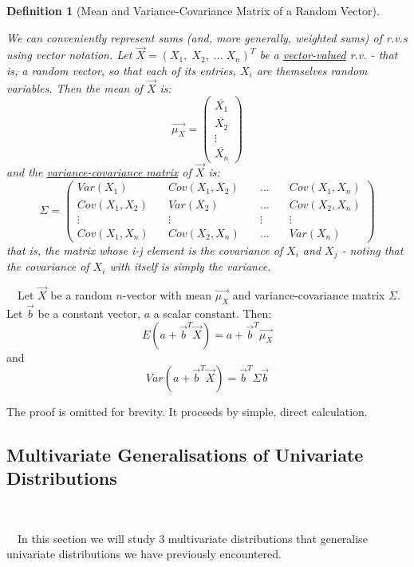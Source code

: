 \documentclass[12pt,a4paper]{article}
\newtheorem{defn}[thm]{Definition}
\begin{document}
\begin{defn}[Mean and Variance-Covariance Matrix of a Random Vector]$\;$\par\vspace{1cm}

We can conveniently represent sums (and, more generally, weighted sums) of r.v.s using vector notation.
Let $\vec{X} = (X_1,\; X_2,\; ...\; X_n)^T$ be a \underline{vector-valued} r.v. - that is, a random vector, so that each of its entries, $X_i$ are themselves random variables. Then the mean of $\vec{X}$ is:
$$\vec{\mu_X} = \left(\begin{array}{c}\overline{X_1}\\ \overline{X_2}\\ \vdots\\ \overline{X_n} \end{array}\right)$$
and the \underline{variance-covariance matrix} of $\vec{X}$ is:
$$\Sigma = \left( \begin{array}{cccc} Var(X_1)\quad& Cov(X_1,X_2)\quad& \hdots\quad& Cov(X_1,X_n)\\Cov(X_1,X_2)\quad& Var(X_2)\quad& \hdots\quad& Cov(X_2,X_n)\\ \vdots\quad& \vdots & \vdots\quad & \vdots\\ Cov(X_1,X_n) & Cov(X_2,X_n)\quad& \hdots& Var(X_n) \end{array}\right)$$
that is, the matrix whose i-j element is the covariance of $X_i$ and $X_j$ - noting that the covariance of $X_i$ with itself is simply the variance.

\end{defn}


$\quad$Let $\vec{X}$ be a random $n$-vector with mean $\vec{\mu_X}$ and variance-covariance matrix $\Sigma$. Let $\vec{b}$ be a constant vector, $a$ a scalar constant. Then:
$$E(a+\vec{b}^T\vec{X}) = a + \vec{b}^T\vec{\mu_X}$$
and
$$Var(a + \vec{b}^T\vec{X}) = \vec{b}^T\Sigma\vec{b}$$

The proof is omitted for brevity. It proceeds by simple, direct calculation.


\subsection{Multivariate Generalisations of Univariate Distributions}$\;$

$\quad$In this section we will study 3 multivariate distributions that generalise univariate distributions we have previously encountered.
\end{document}
